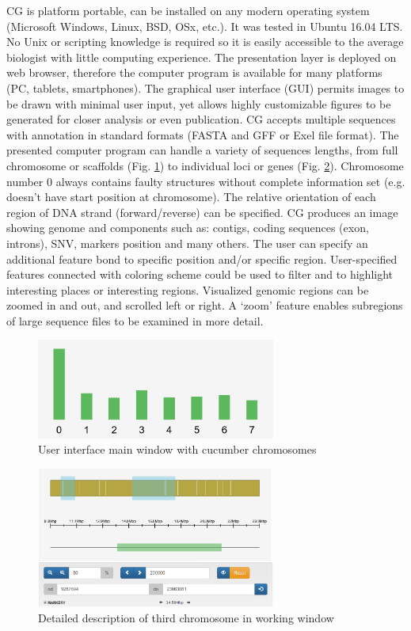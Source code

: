 \documentclass[a4paper]{spie}
\newcommand{\appShortcut}{CG}
\begin{document}
\appShortcut{} is platform portable, can be installed on any modern operating system (Microsoft Windows, Linux, BSD, OSx, etc.).
It was tested in Ubuntu 16.04 LTS.
No Unix or scripting knowledge is required so it is easily accessible to the average biologist with little computing experience.
The presentation layer is deployed on web browser, therefore the computer program is available for many platforms (PC, tablets, smartphones).
The graphical user interface (GUI) permits images to be drawn with minimal user input,
yet allows highly customizable figures to be generated for closer analysis or even publication.
\appShortcut{} accepts multiple sequences with annotation in standard formats (FASTA and GFF or Exel file format).
The presented computer program can handle a variety of sequences lengths, from full chromosome or scaffolds  (Fig. \ref{fig:organism})
to individual loci or genes (Fig. \ref{fig:chromosome}). Chromosome number 0 always contains faulty structures without complete information set (e.g. doesn't have start position at chromosome).
The relative orientation of each region of DNA strand (forward/reverse) can be specified.
\appShortcut{} produces an image showing genome and components such as: contigs, coding sequences (exon, introns), SNV, markers position and many others.
The user can specify an additional feature bond to specific position and/or specific region.
User-specified features connected with coloring scheme could be used to filter and to highlight interesting places or interesting regions.
Visualized genomic regions can be zoomed in and out, and scrolled left or right.
A ‘zoom’ feature enables subregions of large sequence files to be examined in more detail.

\begin{figure}[htp]
  \centering
  \includegraphics[width=0.7\textwidth]{img/chromosomy.png}
  \caption{User interface main window with cucumber chromosomes}
  \label{fig:organism}
\end{figure}


\begin{figure}[htp]
  \centering
  \includegraphics[width=0.7\textwidth]{img/skafoldy2.png}
  \caption{Detailed description of third chromosome in working window}
  \label{fig:chromosome}
\end{figure}
\end{document}
